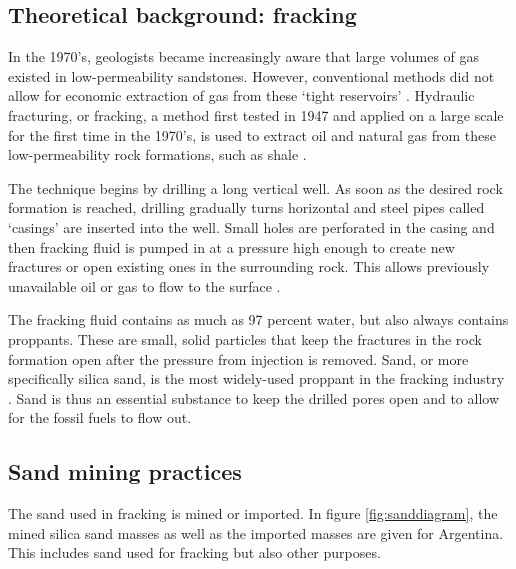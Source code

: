 \subsection{Theoretical background: fracking}
In the 1970's, geologists became increasingly aware that large volumes of gas existed in low-permeability sandstones. However, conventional methods did not allow for economic extraction of gas from these `tight reservoirs' \autocite{lawGasTightReservoirs1992}. Hydraulic fracturing, or fracking, a method first tested in 1947 and applied on a large scale for the first time in the 1970's, is used to extract oil and natural gas from these low-permeability rock formations, such as shale \autocite{denchakFracking1012019}.

The technique begins by drilling a long vertical well. As soon as the desired rock formation is reached, drilling gradually turns horizontal and steel pipes called `casings' are inserted into the well. Small holes are perforated in the casing and then fracking fluid is pumped in at a pressure high enough to create new fractures or open existing ones in the surrounding rock. This allows previously unavailable oil or gas to flow to the surface \autocite{denchakFracking1012019}.

The fracking fluid contains as much as 97 percent water, but also always contains proppants. These are small, solid particles that keep the fractures in the rock formation open after the pressure from injection is removed. Sand, or more specifically silica sand, is the most widely-used proppant in the fracking industry \autocite{denchakFracking1012019}. Sand is thus an essential substance to keep the drilled pores open and to allow for the fossil fuels to flow out.

\subsection{Sand mining practices}
The sand used in fracking is mined or imported. In figure \ref{fig:sanddiagram}, the mined silica sand masses as well as the imported masses are given for Argentina. This includes sand used for fracking but also other purposes.

